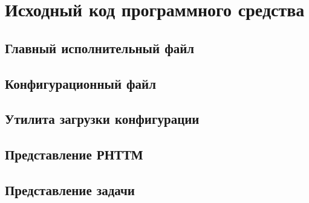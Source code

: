 \chapter{Исходный код программного средства}\label{app:code}

\section{Главный исполнительный файл}\label{app:code1}

\begingroup
\captiondelim{ } %

\endgroup

\newpage

\section{Конфигурационный файл}\label{app:code2}

\begingroup
\captiondelim{ } %

\endgroup

\newpage

\section{Утилита загрузки конфигурации}\label{app:code3}

\begingroup
\captiondelim{ } %

\endgroup

\newpage

\section{Представление РНТТМ}\label{app:code4}

\begingroup
\captiondelim{ } %

\endgroup

\newpage

\section{Представление задачи}\label{app:code5}

